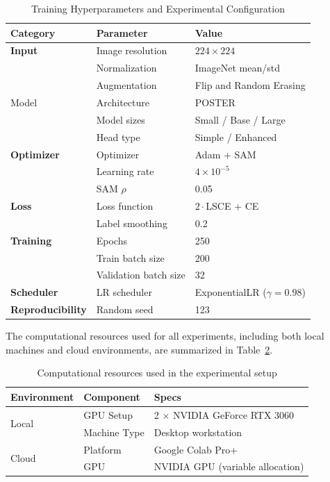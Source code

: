 \begin{table}[h]
\centering
\caption{Training Hyperparameters and Experimental Configuration}
\label{tab:training_hyperparameters}
\begin{tabular}{lll}
\hline
\textbf{Category} & \textbf{Parameter} & \textbf{Value} \\
\hline

\textbf{Input} & Image resolution & $224 \times 224$ \\
 & Normalization & ImageNet mean/std \\
 & Augmentation & Flip and Random Erasing \\
Model & Architecture & POSTER \\
 & Model sizes & Small / Base / Large \\
 & Head type & Simple / Enhanced \\
\textbf{Optimizer} & Optimizer & Adam + SAM \\
 & Learning rate & $4 \times 10^{-5}$ \\
 & SAM $\rho$ & 0.05 \\
\textbf{Loss} & Loss function & $2\cdot$LSCE + CE \\
 & Label smoothing & 0.2 \\
\textbf{Training} & Epochs & 250 \\
 & Train batch size & 200 \\
 & Validation batch size & 32 \\
\textbf{Scheduler} & LR scheduler & ExponentialLR ($\gamma=0.98$) \\
\textbf{Reproducibility} & Random seed & 123 \\
\hline
\end{tabular}
\end{table}

The computational resources used for all experiments, including both local machines and cloud environments, are summarized in Table~\ref{tab:hardware_used}.

\begin{table}[h]
\centering
\caption{Computational resources used in the experimental setup}
\label{tab:hardware_used}
\renewcommand{\arraystretch}{1.4}
\begin{tabular}{@{}l l l@{}}
\toprule
\textbf{Environment} & \textbf{Component} & \textbf{Specs} \\
\midrule
\multirow{2}{*}{Local}
 & GPU Setup & 2 × NVIDIA GeForce RTX 3060 \\
 & Machine Type & Desktop workstation \\
\midrule
\multirow{2}{*}{Cloud}
 & Platform & Google Colab Pro+ \\
 & GPU & NVIDIA GPU (variable allocation) \\
\bottomrule
\end{tabular}
\end{table}


